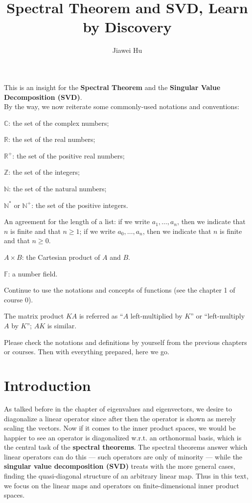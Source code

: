 \documentclass{article}
\title{\LARGE \textbf{Spectral Theorem and SVD, Learn by Discovery}}
\author{\large Jiawei Hu}
\begin{document}
\maketitle

This is an insight for the \textbf{Spectral Theorem} and the \textbf{Singular Value Decomposition (SVD)}. \\ 
By the way, we now reiterate some commonly-used notations and conventions:
\begin{compactenum}
    \item $\mathbb{C}$: the set of the complex numbers;
    \item $\mathbb{R}$: the set of the real numbers;
    \item $\mathbb{R}^+$: the set of the positive real numbers;
    \item $\mathbb{Z}$: the set of the integers;
    \item $\mathbb{N}$: the set of the natural numbers;
    \item $\mathbb{N^\ast}$ or $\mathbb{N}^+$: the set of the positive integers.
    \item An agreement for the length of a list: if we write $a_1, \dots, a_n$, then we indicate that $n$ is finite and that $n\geq 1$; if we write $a_0, \dots, a_n$, then we indicate that $n$ is finite and that $n\geq 0$.
    \item $A\times B$: the Cartesian product of $A$ and $B$.
    \item $\mathbb{F}$: a number field.
    \item Continue to use the notations and concepts of functions (see the chapter 1 of course 0).
    \item The matrix product $KA$ is referred as ``$A$ left-multiplied by $K$'' or ``left-multiply $A$ by $K$''; $AK$ is similar.
\end{compactenum} 
Please check the notations and definitions by yourself from the previous chapters or courses. Then with everything prepared, here we go.

\section{Introduction}
As talked before in the chapter of eigenvalues and eigenvectors, we desire to diagonalize a linear operator since after then the operator is shown as merely scaling the vectors. Now if it comes to the inner product spaces, we would be happier to see an operator is diagonalized w.r.t. an orthonormal basis, which is the central task of the \textbf{spectral theorems}. The spectral theorems answer which linear operators can do this — such operators are only of minority — while the \textbf{singular value decomposition (SVD)} treats with the more general cases, finding the quasi-diagonal structure of an arbitrary linear map. Thus in this text, we focus on the linear maps and operators on finite-dimensional inner product spaces.
\end{document}
